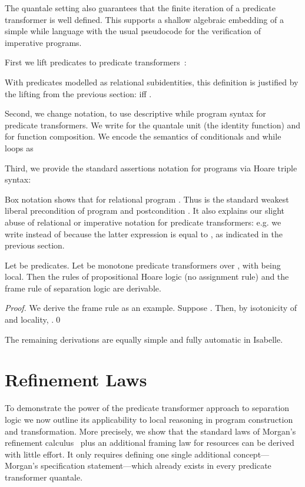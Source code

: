 \documentclass[twoside,runningheads,envcountsame,envcountsect,oribibl,orivec]{llncs}
\begin{document}
The quantale setting also guarantees that the finite iteration
 of a predicate transformer is well defined. This supports a
shallow algebraic embedding of a simple while language with the
usual pseudocode for the verification of imperative programs.

First we lift predicates to predicate transformers~\cite{BvW99-book}:

With predicates modelled as relational subidentities, this definition
is justified by the lifting from the previous section:  iff .

Second, we change notation, to use descriptive while program syntax
for predicate transformers. We write  for the quantale unit
(the identity function) and  for function composition.  We encode
the semantics of conditionals and while loops as

Third, we provide the standard assertions notation for programs via
Hoare triple syntax:

Box notation shows that 
for relational program . Thus  is the
standard weakest liberal precondition of program  and postcondition
. It also explains our slight abuse of relational or imperative
notation for predicate transformers: e.g. we write  instead
of  because the latter expression is equal to ,
as indicated in the previous section.

\begin{proposition}
  Let  be predicates. Let
   be monotone predicate transformers over , with  being local.  Then the rules of propositional
  Hoare logic (no assignment rule) and the frame rule of
  separation logic are derivable.

\end{proposition}
\begin{proof} 
  We derive the frame rule as an example. Suppose . Then,
  by isotonicity of  and locality,
.\qed
\end{proof}
The remaining derivations are equally simple and fully automatic in
Isabelle.



\section{Refinement Laws}\label{sec:refinement}

To demonstrate the power of the predicate transformer approach to
separation logic we now outline its applicability to local reasoning
in program construction and transformation. More precisely, we show
that the standard laws of Morgan's refinement calculus~\cite{Mor98}
plus an additional framing law for resources can be derived with
little effort.  It only requires defining one single additional
concept---Morgan's specification statement---which already exists in
every predicate transformer quantale.
\end{document}
